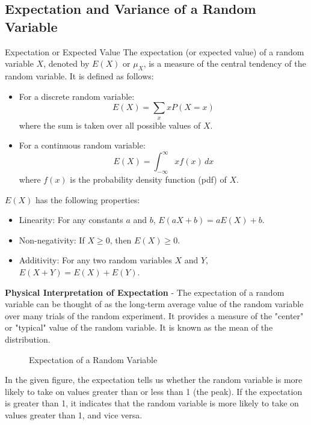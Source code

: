 \documentclass[openany]{book}
\begin{document}
\subsection{Expectation and Variance of a Random Variable}
\begin{mydefinition}{Expectation or Expected Value}
    The expectation (or expected value) of a random variable $X$, denoted by $E(X)$ or $\mu_X$, is a measure of the central tendency of the random variable. It is defined as follows:
    \begin{itemize}
        \item For a discrete random variable:
        $$E(X) = \sum_{x} x P(X = x)$$
        where the sum is taken over all possible values of $X$.
        \item For a continuous random variable:
        $$E(X) = \int_{-\infty}^{\infty} x f(x) \, dx$$
        where $f(x)$ is the probability density function (pdf) of $X$.
    \end{itemize}
    $E(X)$ has the following properties:
    \begin{itemize}
        \item Linearity: For any constants $a$ and $b$, $E(aX + b) = aE(X) + b$.
        \item Non-negativity: If $X \geq 0$, then $E(X) \geq 0$.
        \item Additivity: For any two random variables $X$ and $Y$, $E(X + Y) = E(X) + E(Y)$.
    \end{itemize}
\end{mydefinition}
\textbf{Physical Interpretation of Expectation} - The expectation of a random variable can be thought of as the long-term average value of the random variable over many trials of the random experiment. It provides a measure of the "center" or "typical" value of the random variable. It is known as the mean of the distribution.
\begin{figure}[H]
    \centering
{}
\label{fig:expectation}
\caption{Expectation of a Random Variable}
\end{figure}
In the given figure, the expectation tells us whether the random variable is more likely to take on values greater than or less than 1 (the peak). If the expectation is greater than 1, it indicates that the random variable is more likely to take on values greater than 1, and vice versa. 
\end{document}
